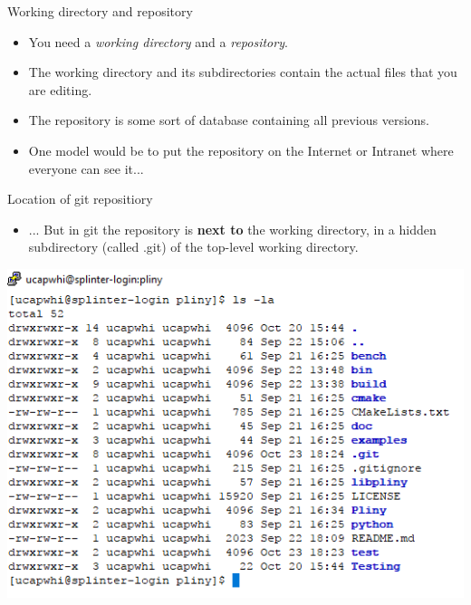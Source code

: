 \documentclass[usenames,dvipsnames]{beamer}
\begin{document}
\begin{frame}{Working directory and repository}
  \begin{block}{}
    \begin{itemize}
      \item{You need a \textit{working directory} and a \textit{repository}.}
      \item{The working directory and its subdirectories contain the actual files that you are editing.}
      \item{The repository is some sort of database containing all previous versions.}
      \item{One model would be to put the repository on the Internet or Intranet where everyone can see it...}
    \end{itemize}
  \end{block}
\end{frame}

\begin{frame}{Location of git repositiory}
  \begin{block}{}
    \begin{itemize}
      \item{... But in git the repository is \textbf{next to} the working directory, in a hidden subdirectory (called .git) of the top-level working directory.}
    \end{itemize}
    \begin{center}
      \includegraphics[scale=0.5]{ls_output.png}
    \end{center}
  \end{block}
\end{frame}
\end{document}
